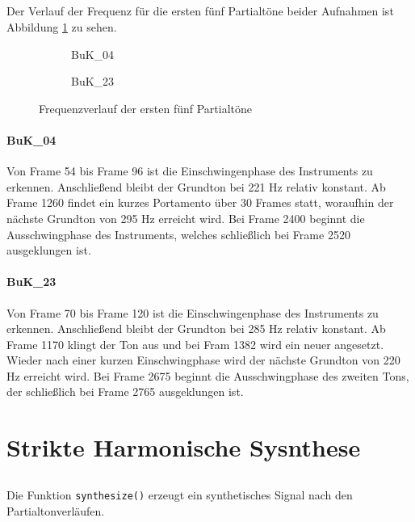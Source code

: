 \subsection{}
Der Verlauf der Frequenz für die ersten fünf Partialtöne beider Aufnahmen ist Abbildung \ref{fig:freq} zu sehen.

\begin{figure}[H]
    \centering
    \begin{subfigure}{.5\textwidth}
        \centering
        \caption{BuK\_04}
        \scalebox{0.5}{}
    \end{subfigure}%
    \begin{subfigure}{.5\textwidth}
        \centering
        \caption{BuK\_23}
        \scalebox{0.5}{}
    \end{subfigure}
    \caption{Frequenzverlauf der ersten fünf Partialtöne}
    \label{fig:freq}
\end{figure}

\paragraph{BuK\_04}
Von Frame 54 bis Frame 96 ist die Einschwingenphase des Instruments zu erkennen.
Anschließend bleibt der Grundton bei 221 Hz relativ konstant.
Ab Frame 1260 findet ein kurzes Portamento über 30 Frames statt, woraufhin der nächste Grundton von 295 Hz erreicht wird.
Bei Frame 2400 beginnt die Ausschwingphase des Instruments, welches schließlich bei Frame 2520 ausgeklungen ist.

\paragraph{BuK\_23}
Von Frame 70 bis Frame 120 ist die Einschwingenphase des Instruments zu erkennen.
Anschließend bleibt der Grundton bei 285 Hz relativ konstant.
Ab Frame 1170 klingt der Ton aus und bei Fram 1382 wird ein neuer angesetzt.
Wieder nach einer kurzen Einschwingphase wird der nächste Grundton von 220 Hz erreicht wird.
Bei Frame 2675 beginnt die Ausschwingphase des zweiten Tons, der schließlich bei Frame 2765 ausgeklungen ist.


\section{Strikte Harmonische Sysnthese}
\label{sec:2}

\subsection{}
Die Funktion \texttt{synthesize()} erzeugt ein synthetisches Signal nach den Partialtonverläufen.


